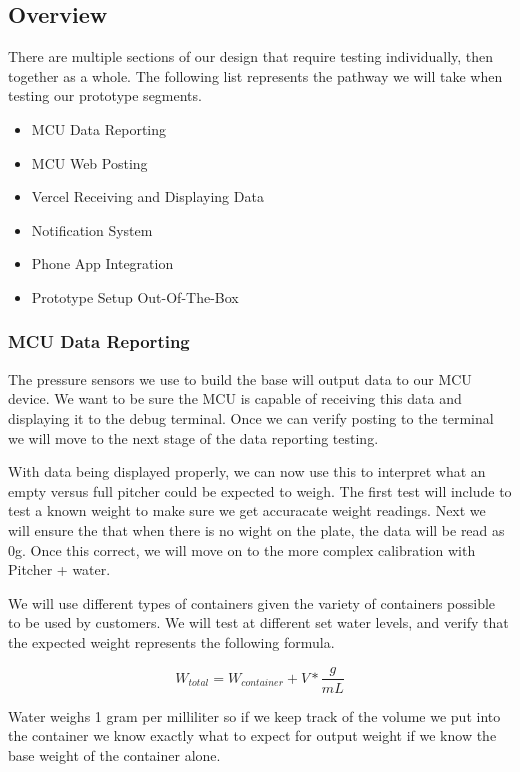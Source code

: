 \subsection{Overview}

There are multiple sections of our design that require testing individually, then together as a whole. The following list represents the pathway we will take when testing our prototype segments.

\begin{itemize}
\item MCU Data Reporting
\item MCU Web Posting
\item Vercel Receiving and Displaying Data
\item Notification System
\item Phone App Integration
\item Prototype Setup Out-Of-The-Box
\end{itemize}

\subsubsection*{MCU Data Reporting}

The pressure sensors we use to build the base will output data to our MCU device. We want to be sure the MCU is capable of receiving this data and displaying it to the debug terminal. Once we can verify posting to the terminal we will move to the next stage of the data reporting testing.

With data being displayed properly, we can now use this to interpret what an empty versus full pitcher could be expected to weigh. The first test will include to test a known weight to make sure we get accuracate weight readings. 
Next we will ensure the that when there is no wight on the plate, the data will be read as 0g.
Once this correct, we will move on to the more complex calibration with Pitcher + water.


We will use different types of containers given the variety of containers possible to be used by customers. We will test at different set water levels, and verify that the expected weight represents the following formula. 

\begin{equation}
W_{total} = W_{container} + V * \frac{g}{mL}
\end{equation}

Water weighs 1 gram per milliliter so if we keep track of the volume we put into the container we know exactly what to expect for output weight if we know the base weight of the container alone. 

